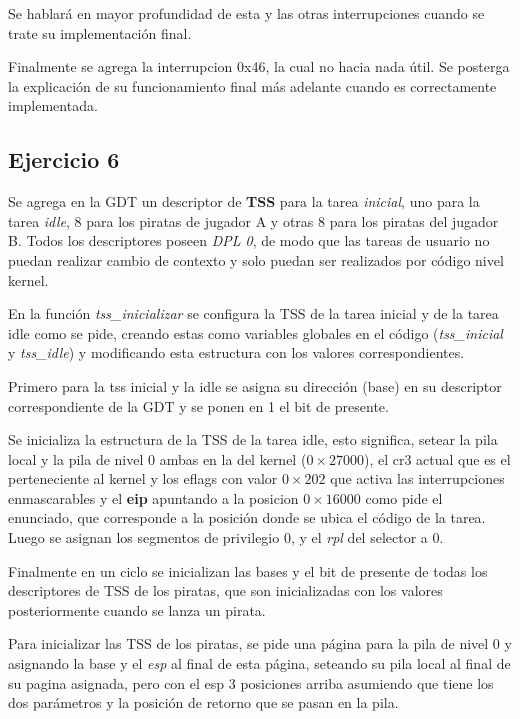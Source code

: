 Se hablará en mayor profundidad de esta y las otras
interrupciones cuando se trate su implementación final.

Finalmente se agrega la interrupcion 0x46, la cual no hacia nada útil. Se
posterga la explicación de su funcionamiento final más adelante cuando es
correctamente implementada.


\subsection{Ejercicio 6}

Se agrega en la GDT un descriptor de {\bf TSS} para la tarea {\it inicial\/},
uno para la tarea {\it idle\/}, 8 para los piratas de jugador A y otras 8 para
los piratas del jugador B. Todos los descriptores poseen {\it DPL 0\/}, de modo
que las tareas de usuario no puedan realizar cambio de contexto y solo puedan
ser realizados por código nivel kernel.

En la función {\it tss_inicializar\/} se configura la TSS de la tarea inicial y
de la tarea idle como se pide, creando estas como variables globales en el
código ({\it tss_inicial} y {\it tss_idle}) y modificando esta estructura con
los valores correspondientes.

Primero para la tss inicial y la idle se asigna su dirección (base) en su
descriptor correspondiente de la GDT y se ponen en 1 el bit de presente.

Se inicializa la estructura de la TSS de la tarea idle, esto significa, setear
la pila local y la pila de nivel 0 ambas en la del kernel ($0\times27000$),
el cr3 actual que es el perteneciente al kernel y los eflags con valor
$0\times202$ que activa las interrupciones enmascarables y el {\bf eip}
apuntando a la posicion $0\times16000$ como pide el enunciado, que corresponde
a la posición donde se ubica el código de la tarea.
Luego se asignan los segmentos de privilegio 0, y el {\it rpl\/} del selector a
0.

Finalmente en un ciclo se inicializan las bases y el bit de presente de todas
los descriptores de TSS de los piratas, que son inicializadas con los valores
posteriormente cuando se lanza un pirata.

Para inicializar las TSS de los piratas, se pide una página para la pila de
nivel 0 y asignando la base y el {\it esp\/} al final de esta página, seteando
su pila local al final de su pagina asignada, pero con el esp 3 posiciones
arriba asumiendo que tiene los dos parámetros y la posición de retorno que se
pasan en la pila.

